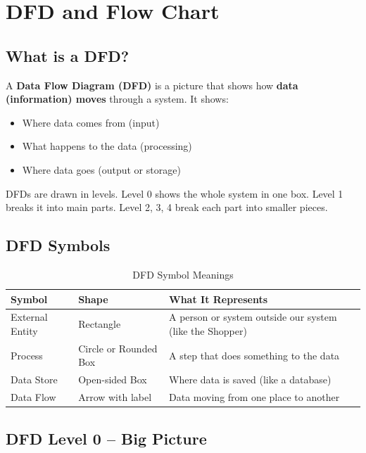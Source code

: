 \documentclass[10pt, a4paper]{report}
\begin{document}
\chapter{DFD and Flow Chart}

\section{What is a DFD?}

A \textbf{Data Flow Diagram (DFD)} is a picture that shows how \textbf{data (information) moves} through a system. It shows:
\begin{itemize}
  \item Where data comes from (input)
  \item What happens to the data (processing)
  \item Where data goes (output or storage)
\end{itemize}

DFDs are drawn in levels. Level 0 shows the whole system in one box. Level 1 breaks it into main parts. Level 2, 3, 4 break each part into smaller pieces.

\section{DFD Symbols}

\begin{table}[H]
\centering
\caption{DFD Symbol Meanings}
\begin{tabular}{lll}
\toprule
\textbf{Symbol} & \textbf{Shape} & \textbf{What It Represents} \\
\midrule
External Entity & Rectangle & A person or system outside our system (like the Shopper) \\
Process & Circle or Rounded Box & A step that does something to the data \\
Data Store & Open-sided Box & Where data is saved (like a database) \\
Data Flow & Arrow with label & Data moving from one place to another \\
\bottomrule
\end{tabular}
\end{table}

\section{DFD Level 0 -- Big Picture}
\end{document}
